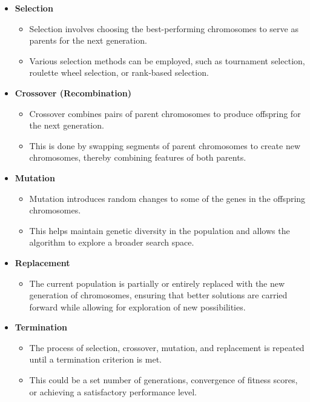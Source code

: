 \begin{itemize}
    \item \textbf{Selection}
          \begin{itemize}
              \item Selection involves choosing the best-performing chromosomes to serve as parents
                    for the next generation.
              \item Various selection methods can be employed, such as tournament selection,
                    roulette wheel selection, or rank-based selection.
          \end{itemize}
          \newpage
    \item \textbf{Crossover (Recombination)}
          \begin{itemize}
              \item Crossover combines pairs of parent chromosomes to produce offspring for the
                    next generation.
              \item This is done by swapping segments of parent chromosomes to create new
                    chromosomes, thereby combining features of both parents.
          \end{itemize}

    \item \textbf{Mutation}
          \begin{itemize}
              \item Mutation introduces random changes to some of the genes in the offspring
                    chromosomes.
              \item This helps maintain genetic diversity in the population and allows the
                    algorithm to explore a broader search space.
          \end{itemize}

    \item \textbf{Replacement}
          \begin{itemize}
              \item The current population is partially or entirely replaced with the new
                    generation of chromosomes, ensuring that better solutions are carried forward
                    while allowing for exploration of new possibilities.
          \end{itemize}

    \item \textbf{Termination}
          \begin{itemize}
              \item The process of selection, crossover, mutation, and replacement is repeated
                    until a termination criterion is met.
              \item This could be a set number of generations, convergence of fitness scores, or
                    achieving a satisfactory performance level.
          \end{itemize}


\end{itemize}
